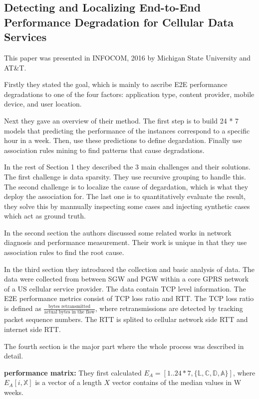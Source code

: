 \documentclass{manuscript}
\begin{document}
    \subsection{Detecting and Localizing End-to-End Performance Degradation for Cellular Data Services \cite{ahmed_detecting_2016}}

    This paper was presented in INFOCOM, 2016 by Michigan State University and AT\&T.

    Firstly they stated the goal, which is mainly to ascribe E2E performance degradations to one of the four factors:
    application type, content provider, mobile device, and user location.

    Next they gave an overview of their method. The first step is to build 24 * 7 models that predicting the performance
    of the instances correspond to a specific hour in a week. Then, use these predictions to define degardation. Finally
    use association rules mining to find patterns that cause degradations.

    In the rest of Section 1 they described the 3 main challenges and their solutions. The first challenge is data sparsity.
    They use recursive grouping to handle this. The second challenge is to localize the cause of degardation, which is
    what they deploy the association for. The last one is to quantitatively evaluate the result, they solve this by mannually
    inspecting some cases and injecting synthetic cases which act as ground truth.

    In the second section the authors discussed some related works in network diagnosis and performance measurement. Their
    work is unique in that they use association rules to find the root cause.

    In the third section they introduced the collection and basic analysis of data. The data were collected from between
    SGW and PGW within a core GPRS network of a US cellular service provider. The data contain TCP level information. The
    E2E performance metrics consist of TCP loss ratio and RTT. The TCP loss ratio is defined as $\frac{\text{bytes retransmitted}}
    {\text{actual bytes in the flow}}$, where retransmissions are detected by tracking packet sequence numbers. The RTT
    is splited to cellular network side RTT and internet side RTT.

    The fourth section is the major part where the whole process was described in detail.

    \textbf{performance matrix:} They first calculated $E_A = [1..24 * 7, \{\mathbb{L}, \mathbb{C}, \mathbb{D}, \mathbb{A}\}]$,
    where $E_A[i, \mathbb{X}]$ is a vector of a length $X$ vector contains of the median values in W weeks.
\end{document}
